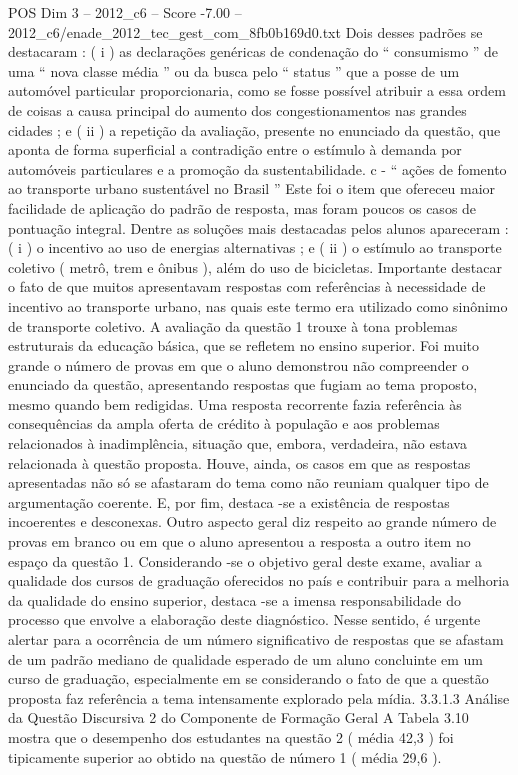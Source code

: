 \begin{textsample}{POS Dim 3 – 2012\_c6 – Score -7.00 – 2012\_c6/enade\_2012\_tec\_gest\_com\_8fb0b169d0.txt}
Dois desses padrões se destacaram : ( i ) as declarações genéricas de condenação do “ consumismo ” de uma “ nova classe média ” ou da busca pelo “ status ” que a posse de um automóvel particular proporcionaria, como se fosse possível atribuir a essa ordem de coisas a causa principal do aumento dos congestionamentos nas grandes cidades ; e ( ii ) a repetição da avaliação, presente no enunciado da questão, que aponta de forma superficial a contradição entre o estímulo à demanda por automóveis particulares e a promoção da sustentabilidade. c - “ ações de fomento ao transporte urbano sustentável no Brasil ” Este foi o item que ofereceu maior facilidade de aplicação do padrão de resposta, mas foram poucos os casos de pontuação integral.
Dentre as soluções mais destacadas pelos alunos apareceram : ( i ) o incentivo ao uso de energias alternativas ; e ( ii ) o estímulo ao transporte coletivo ( metrô, trem e ônibus ), além do uso de bicicletas.
Importante destacar o fato de que muitos apresentavam respostas com referências à necessidade de incentivo ao transporte urbano, nas quais este termo era utilizado como sinônimo de transporte coletivo.
A avaliação da questão 1 trouxe à tona problemas estruturais da educação básica, que se refletem no ensino superior.
Foi muito grande o número de provas em que o aluno demonstrou não compreender o enunciado da questão, apresentando respostas que fugiam ao tema proposto, mesmo quando bem redigidas.
Uma resposta recorrente fazia referência às consequências da ampla oferta de crédito à população e aos problemas relacionados à inadimplência, situação que, embora, verdadeira, não estava relacionada à questão proposta.
Houve, ainda, os casos em que as respostas apresentadas não só se afastaram do tema como não reuniam qualquer tipo de argumentação coerente.
E, por fim, destaca -se a existência de respostas incoerentes e desconexas.
Outro aspecto geral diz respeito ao grande número de provas em branco ou em que o aluno apresentou a resposta a outro item no espaço da questão 1.
Considerando -se o objetivo geral deste exame, avaliar a qualidade dos cursos de graduação oferecidos no país e contribuir para a melhoria da qualidade do ensino superior, destaca -se a imensa responsabilidade do processo que envolve a elaboração deste diagnóstico.
Nesse sentido, é urgente alertar para a ocorrência de um número significativo de respostas que se afastam de um padrão mediano de qualidade esperado de um aluno concluinte em um curso de graduação, especialmente em se considerando o fato de que a questão proposta faz referência a tema intensamente explorado pela mídia. 3.3.1.3 Análise da Questão Discursiva 2 do Componente de Formação Geral A Tabela 3.10 mostra que o desempenho dos estudantes na questão 2 ( média 42,3 ) foi tipicamente superior ao obtido na questão de número 1 ( média 29,6 ).

\end{textsample}
